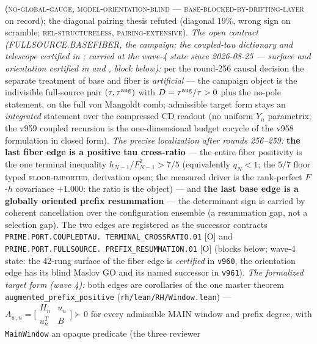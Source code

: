 \documentclass[11pt,a4paper]{article}
\begin{document}
{(\textsc{no-global-gauge}, \textsc{model-orientation-blind} ---
\textsc{base-blocked-by-drifting-layer} on record); the diagonal
pairing thesis refuted (diagonal $19\%$, wrong sign on scramble;
\textsc{rel-structureless}, \textsc{pairing-extensive}).
\emph{The open contract (FULLSOURCE.BASEFIBER, the campaign;
the coupled-tau dictionary and telescope certified in
; carried at the
wave-4 state since 2026-08-25 --- surface and orientation
certified in  and
, block
below):} per the
round-256 causal decision the separate treatment of base and
fiber is \emph{artificial} --- the campaign object is the
indivisible full-source pair $(\tau, \tau^{\rm aug})$ with $D =
\tau^{\rm aug}/\tau > 0$ plus the no-pole statement, on the full
von Mangoldt comb; admissible target form stays an
\emph{integrated} statement over the compressed CD readout (no
uniform $Y_n$ parametrix; the v959 coupled recursion is the
one-dimensional budget cocycle of the v958 formulation in closed
form).  \emph{The precise localization after rounds 256--259:}
\textbf{the last fiber edge is a positive tau cross-ratio} ---
the entire fiber positivity is the one terminal inequality
$h_{N-1}/F_{N-1}^2 > 7/5$ (equivalently $q_N < 1$; the $5/7$
floor typed \textsc{floor-imported}, derivation open; the
measured driver is the rank-perfect $F$-$h$ covariance $+1.000$:
the ratio is the object) --- and \textbf{the last base edge is a
globally oriented prefix resummation} --- the determinant sign is
carried by coherent cancellation over the configuration ensemble
(a resummation gap, not a selection gap).  The two edges are
registered as the successor contracts
\texttt{PRIME.PORT.COUPLEDTAU.\allowbreak
TERMINAL\_CROSSRATIO.01} [O] and
\texttt{PRIME.PORT.FULLSOURCE.\allowbreak
PREFIX\_RESUMMATION.01} [O] (blocks below; wave-4 state: the
42-rung surface of the fiber edge is \emph{certified} in
\texttt{v960}, the orientation edge has its blind Maslov GO and
its named successor in \texttt{v961}).  \emph{The formalized
target form (wave 4):} both edges are corollaries of the one
master theorem \texttt{augmented\_prefix\_positive}
(\texttt{rh/lean/RH/Window.lean}) --- $A_{w,n} = \bigl[\begin{smallmatrix} H_n & u_n\\ u_n^{T} & B \end{smallmatrix}\bigr] \succ 0$
for every admissible MAIN window and prefix degree, with
\texttt{MainWindow} an opaque predicate (the three reviewer
}
\end{document}
